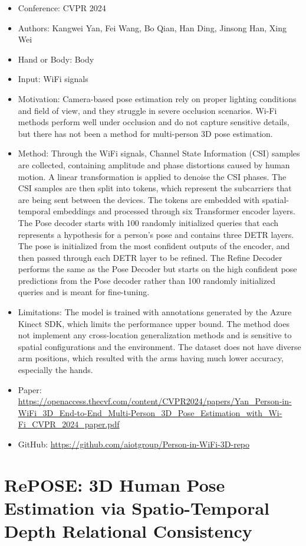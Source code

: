 \documentclass{article}
\begin{document}
\begin{itemize}
    \item Conference: CVPR 2024
    \item Authors: Kangwei Yan, Fei Wang, Bo Qian, Han Ding, Jinsong Han, Xing Wei
    \item Hand or Body: Body
    \item Input: WiFi signals
    \item Motivation: Camera-based pose estimation rely on proper lighting conditions and field of view, and they struggle in severe occlusion scenarios. Wi-Fi methods perform well under occlusion and do not capture sensitive details, but there has not been a method for multi-person 3D pose estimation.
    \item Method: Through the WiFi signals, Channel State Information (CSI) samples are collected, containing amplitude and phase distortions caused by human motion. A linear transformation is applied to denoise the CSI phases. The CSI samples are then split into tokens, which represent the subcarriers that are being sent between the devices. The tokens are embedded with spatial-temporal embeddings and processed through six Transformer encoder layers. The Pose decoder starts with 100 randomly initialized queries that each represents a hypothesis for a person's pose and contains three DETR layers. The pose is initialized from the most confident outputs of the encoder, and then passed through each DETR layer to be refined. The Refine Decoder performs the same as the Pose Decoder but starts on the high confident pose predictions from the Pose decoder rather than 100 randomly initialized queries and is meant for fine-tuning.
    \item Limitations: The model is trained with annotations generated by the Azure Kinect SDK, which limits the performance upper bound. The method does not implement any cross-location generalization methods and is sensitive to spatial configurations and the environment. The dataset does not have diverse arm positions, which resulted with the arms having much lower accuracy, especially the hands.
    \item Paper: \url{https://openaccess.thecvf.com/content/CVPR2024/papers/Yan_Person-in-WiFi_3D_End-to-End_Multi-Person_3D_Pose_Estimation_with_Wi-Fi_CVPR_2024_paper.pdf}
    \item GitHub: \url{https://github.com/aiotgroup/Person-in-WiFi-3D-repo}
\end{itemize}

\section*{RePOSE: 3D Human Pose Estimation via Spatio-Temporal Depth Relational Consistency}
\end{document}
